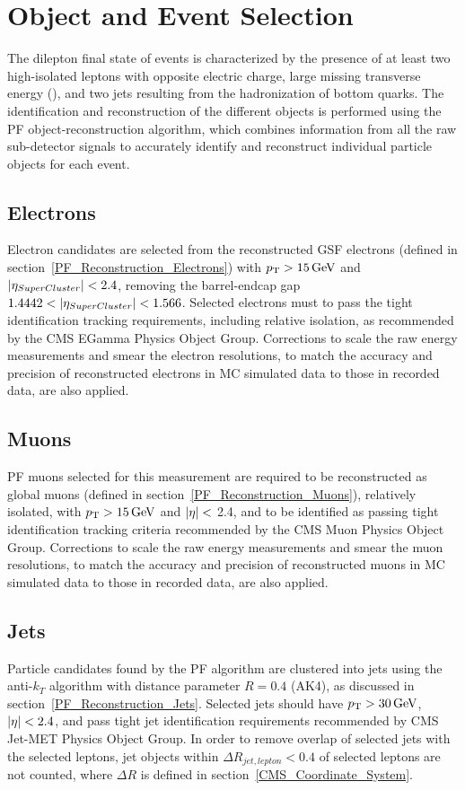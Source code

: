\section{Object and Event Selection}
The dilepton final state of \ttbar events is characterized by the presence of at least two high-\pT isolated leptons with opposite electric charge, large missing transverse energy (\MET), and two jets resulting from the hadronization of bottom quarks.
The identification and reconstruction of the different objects is performed using the PF object-reconstruction algorithm, which combines information from all the raw sub-detector signals to accurately identify and reconstruct individual particle objects for each event. 
\subsection{Electrons}
Electron candidates are selected from the reconstructed GSF electrons (defined in section~\ref{PF_Reconstruction_Electrons}) with $\pT > \SI{15}{\GeV}$ and $\left\vert\eta_{SuperCluster}\right\vert< 2.4$, removing the barrel-endcap gap $1.4442 < \left\vert\eta_{SuperCluster}\right\vert< 1.566$. 
Selected electrons must to pass the tight identification tracking requirements, including relative isolation, as recommended by the CMS EGamma Physics Object Group.
Corrections to scale the raw energy measurements and smear the electron resolutions, to match the accuracy and precision of reconstructed electrons in MC simulated data to those in recorded data, are also applied.
\subsection{Muons}
PF muons selected for this measurement are required to be reconstructed as global muons (defined in section~\ref{PF_Reconstruction_Muons}), relatively isolated, with $\pT > \SI{15}{\GeV}$ and $\left\vert\eta\right\vert<$ 2.4, and to be identified as passing tight identification tracking criteria recommended by the CMS Muon Physics Object Group.
Corrections to scale the raw energy measurements and smear the muon resolutions, to match the accuracy and precision of reconstructed muons in MC simulated data to those in recorded data, are also applied.
\subsection{Jets}
Particle candidates found by the PF algorithm are clustered into jets using the anti-$k_T$ algorithm with distance parameter $R = 0.4$ (AK4), as discussed in section~\ref{PF_Reconstruction_Jets}. 
Selected jets should have $\pT > \SI{30}{\GeV}$, $\left\vert\eta\right\vert <2.4$, and pass tight jet identification requirements recommended by CMS Jet-MET Physics Object Group.
In order to remove overlap of selected jets with the selected leptons, jet objects within $\Delta R_{jet,lepton} < 0.4$ of selected leptons are not counted, where $\Delta R$ is defined in section~\ref{CMS_Coordinate_System}.
